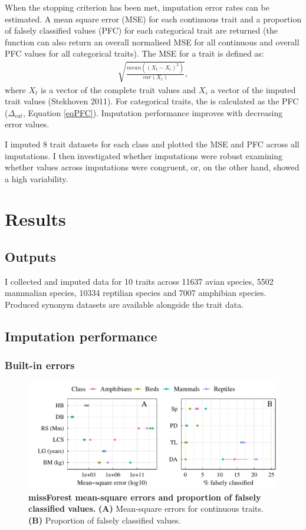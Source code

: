 When the stopping criterion has been met, imputation error rates can be estimated. A mean square error (MSE) for each continuous trait and a proportion of falsely classified values (PFC) for each categorical trait are returned (the function can also return an overall normalised MSE for all continuous and overall PFC values for all categorical traits). The MSE for a trait is defined as:
\begin{align}
\sqrt{\frac{mean\left(\left(X_t-X_i\right)^2\right)}{var\left(X_t\right)}}, 
\end{align}
where $X_t$ is a vector of the complete trait values and $X_i$ a vector of the imputed trait values (Stekhoven 2011). For categorical traits, the  is calculated as the PFC ($\Delta_{cat}$, Equation \ref{eqPFC}). Imputation performance improves with decreasing error values.

I imputed 8 trait datasets for each class and plotted the MSE and PFC across all imputations. I then investigated whether imputations were robust examining whether values across imputations were congruent, or, on the other hand, showed a high variability.


\pagebreak
\section{Results}

\subsection{Outputs}
I collected and imputed data for 10 traits across 11637 avian species, 5502 mammalian species, 10334 reptilian species and 7007 amphibian species. Produced synonym datasets are available alongside the trait data. 

\subsection{Imputation performance}
\subsubsection{Built-in errors}

\begin{figure}[h!]
\centering
\includegraphics[scale=0.75]{figures/chapter2/Imputation_errors/MSE_PFC}
\caption[missForest mean-square errors and proportion of falsely classified values]{\textbf{missForest mean-square errors and proportion of falsely classified values.} \textbf{(A)} Mean-square errors for continuous traits. \textbf{(B)} Proportion of falsely classified values.}
\label{plotPFC}
\end{figure}


